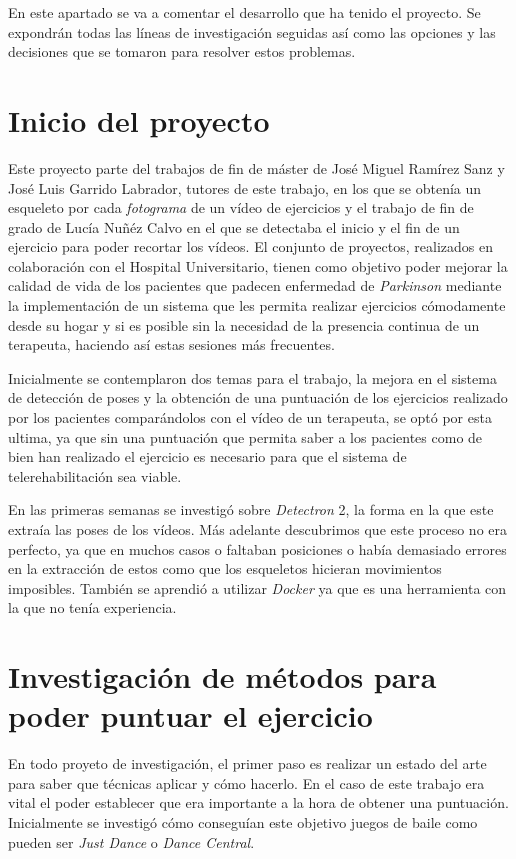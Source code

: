 En este apartado se va a comentar el desarrollo que ha tenido el proyecto. Se expondrán todas las líneas de investigación seguidas así como las opciones y las decisiones que se tomaron para resolver estos problemas.

\section{Inicio del proyecto}
Este proyecto parte del trabajos de fin de máster de José Miguel Ramírez Sanz y José Luis Garrido Labrador, tutores de este trabajo, en los que se obtenía un esqueleto por cada \textit{fotograma} de un vídeo de ejercicios y el trabajo de fin de grado de Lucía Nuñéz Calvo en el que se detectaba el inicio y el fin de un ejercicio para poder recortar los vídeos. El conjunto de proyectos, realizados en colaboración con el Hospital Universitario, tienen como objetivo poder mejorar la calidad de vida de los pacientes que padecen enfermedad de \textit{Parkinson} mediante la implementación de un sistema que les permita realizar ejercicios cómodamente desde su hogar y si es posible sin la necesidad de la presencia continua de un terapeuta, haciendo así estas sesiones más frecuentes.

Inicialmente se contemplaron dos temas para el trabajo, la mejora en el sistema de detección de poses y la obtención de una puntuación de los ejercicios realizado por los pacientes comparándolos con el vídeo de un terapeuta, se optó por esta ultima, ya que sin una puntuación que permita saber a los pacientes como de bien han realizado el ejercicio es necesario para que el sistema de telerehabilitación sea viable.

En las primeras semanas se investigó sobre \textit{Detectron} 2, la forma en la que este extraía las poses de los vídeos. Más adelante descubrimos que este proceso no era perfecto, ya que en muchos casos o faltaban posiciones o había demasiado errores en la extracción de estos como que los esqueletos hicieran movimientos imposibles. También se aprendió a utilizar \textit{Docker} ya que es una herramienta con la que no tenía experiencia.

\section{Investigación de métodos para poder puntuar el ejercicio}
En todo proyeto de investigación, el primer paso es realizar un estado del arte para saber que técnicas aplicar y cómo hacerlo. En el caso de este trabajo era vital el poder establecer que era importante a la hora de obtener una puntuación. Inicialmente se investigó cómo conseguían este objetivo juegos de baile como pueden ser \textit{Just Dance} o \textit{Dance Central}.

